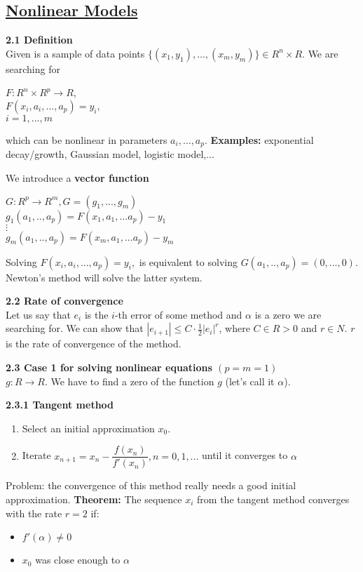 \documentclass{article}
\begin{document}
\begin{multicols}{3}
\section{\underline{Nonlinear Models}}

\textbf{2.1 Definition}\\
Given is a sample of data points $\{(x_1, y_1), \dots ,(x_m, y_m)\} \in R^n \times R$.
We are searching for
\begin{center}
$F: R^n \times R^p \rightarrow R$, \\
$F(x_i, a_i, ..., a_p) = y_i,$ \\
$i = 1,...,m$
\end{center}
which can be nonlinear in parameters $a_i, \dots ,a_p$.
\textbf{Examples:} exponential decay/growth, Gaussian model, logistic model,...

We introduce a \textbf{vector function}
\begin{center}
$G: R^p \rightarrow R^m, G = (g_1,...,g_m)$\\
$g_1(a_1,..,a_p) = F(x_1,a_1,...a_p) - y_1$\\
$\vdots$\\
$g_m(a_1,..,a_p) = F(x_m,a_1,...a_p) - y_m$
\end{center}

Solving $F(x_i, a_i, ..., a_p) = y_i,$ is equivalent to solving $G(a_1,..,a_p) = (0,...,0)$. 
Newton's method will solve the latter system.

\textbf{2.2 Rate of convergence}\\
Let us say that $e_i$ is the $i$-th error of some method and $\alpha$ is
a zero we are searching for. We can show that $|e_{i+1}| \leq C \cdot \frac{1}{2}|e_i|^r$, where $C \in R>0$ and $r \in N$. $r$ is
the rate of convergence of the method.

\textbf{2.3 Case 1 for solving nonlinear equations  $(p = m = 1)$}\\
$g: R \rightarrow R$. We have to find a zero of the function $g$ (let's call it $\alpha$).

\textbf{2.3.1 Tangent method}
\begin{enumerate}
    \item Select an initial approximation $x_0$.
    \item Iterate $x_{n+1} = x_n - \dfrac{f(x_n)}{f'(x_n)}, n=0,1,...$ until it converges to $\alpha$
\end{enumerate}
Problem: the convergence of this method really needs a good initial approximation.
\textbf{Theorem:} The sequence $x_i$ from the tangent method converges with the rate
$r = 2$ if:
\begin{itemize}
  \item $f'(\alpha) \neq 0$
  \item $x_0$ was close enough to $\alpha$
\end{itemize}


\end{multicols}
\end{document}
